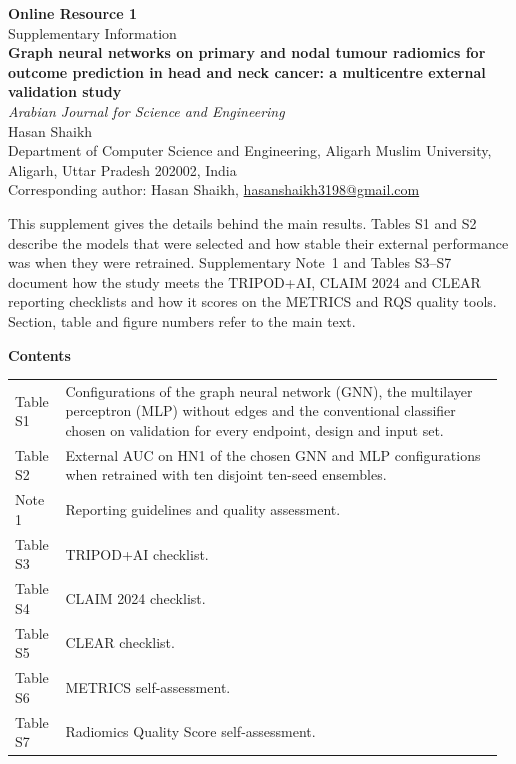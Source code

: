 \documentclass[10pt,a4paper]{article}
\begin{document}
\begin{center}
{\Large\bfseries Online Resource 1}\\[4pt]
{\normalsize Supplementary Information}\\[8pt]
{\large\bfseries Graph neural networks on primary and nodal tumour radiomics for outcome prediction in head and neck cancer: a multicentre external validation study}\\[8pt]
{\normalsize\itshape Arabian Journal for Science and Engineering}\\[8pt]
{\normalsize Hasan Shaikh}\\[2pt]
{\small Department of Computer Science and Engineering, Aligarh Muslim University, Aligarh, Uttar Pradesh 202002, India}\\[2pt]
{\small Corresponding author: Hasan Shaikh, \href{mailto:hasanshaikh3198@gmail.com}{hasanshaikh3198@gmail.com}}
\end{center}

\vspace{4pt}
\noindent This supplement gives the details behind the main results. Tables S1 and S2 describe the models that were selected and how stable their external performance was when they were retrained. Supplementary Note~1 and Tables S3--S7 document how the study meets the TRIPOD+AI, CLAIM 2024 and CLEAR reporting checklists and how it scores on the METRICS and RQS quality tools. Section, table and figure numbers refer to the main text.

\vspace{6pt}
\noindent\textbf{Contents}\par\vspace{4pt}
\noindent\begin{tabular}{@{}p{0.1\linewidth}p{0.87\linewidth}@{}}
Table S1 & Configurations of the graph neural network (GNN), the multilayer perceptron (MLP) without edges and the conventional classifier chosen on validation for every endpoint, design and input set.\\[4pt]
Table S2 & External AUC on HN1 of the chosen GNN and MLP configurations when retrained with ten disjoint ten-seed ensembles.\\[4pt]
Note 1 & Reporting guidelines and quality assessment.\\[4pt]
Table S3 & TRIPOD+AI checklist.\\[4pt]
Table S4 & CLAIM 2024 checklist.\\[4pt]
Table S5 & CLEAR checklist.\\[4pt]
Table S6 & METRICS self-assessment.\\[4pt]
Table S7 & Radiomics Quality Score self-assessment.\\
\end{tabular}
\end{document}
